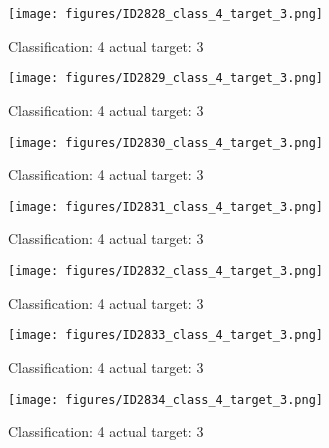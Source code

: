 \begin{figure}[h!]
\begin{center}
\texttt{[image: figures/ID2828\_class\_4\_target\_3.png]}
\end{center}
\caption{ Classification: 4 actual target: 3}
\label{fig:ID2828_class_4_target_3}
\end{figure}
\begin{figure}[h!]
\begin{center}
\texttt{[image: figures/ID2829\_class\_4\_target\_3.png]}
\end{center}
\caption{ Classification: 4 actual target: 3}
\label{fig:ID2829_class_4_target_3}
\end{figure}
\begin{figure}[h!]
\begin{center}
\texttt{[image: figures/ID2830\_class\_4\_target\_3.png]}
\end{center}
\caption{ Classification: 4 actual target: 3}
\label{fig:ID2830_class_4_target_3}
\end{figure}
\begin{figure}[h!]
\begin{center}
\texttt{[image: figures/ID2831\_class\_4\_target\_3.png]}
\end{center}
\caption{ Classification: 4 actual target: 3}
\label{fig:ID2831_class_4_target_3}
\end{figure}
\begin{figure}[h!]
\begin{center}
\texttt{[image: figures/ID2832\_class\_4\_target\_3.png]}
\end{center}
\caption{ Classification: 4 actual target: 3}
\label{fig:ID2832_class_4_target_3}
\end{figure}
\begin{figure}[h!]
\begin{center}
\texttt{[image: figures/ID2833\_class\_4\_target\_3.png]}
\end{center}
\caption{ Classification: 4 actual target: 3}
\label{fig:ID2833_class_4_target_3}
\end{figure}
\begin{figure}[h!]
\begin{center}
\texttt{[image: figures/ID2834\_class\_4\_target\_3.png]}
\end{center}
\caption{ Classification: 4 actual target: 3}
\label{fig:ID2834_class_4_target_3}
\end{figure}

